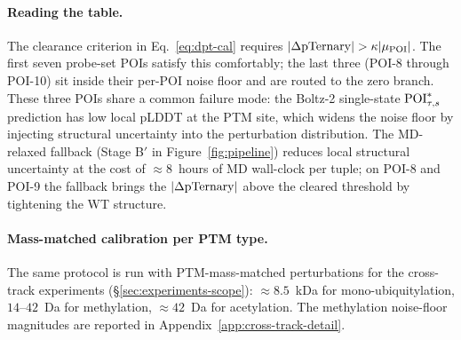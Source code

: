\paragraph{Reading the table.} The clearance criterion in Eq.~\ref{eq:dpt-cal} requires $|\Delta\mathrm{pTernary}| > \kappa|\mu_{\mathrm{POI}}|$. The first seven probe-set POIs satisfy this comfortably; the last three (POI-8 through POI-10) sit inside their per-POI noise floor and are routed to the zero branch. These three POIs share a common failure mode: the Boltz-2 single-state $\mathrm{POI}^{*}_{\tau,s}$ prediction has low local pLDDT at the PTM site, which widens the noise floor by injecting structural uncertainty into the perturbation distribution. The MD-relaxed fallback (Stage B$'$ in Figure~\ref{fig:pipeline}) reduces local structural uncertainty at the cost of $\approx 8$~hours of MD wall-clock per tuple; on POI-8 and POI-9 the fallback brings the $|\Delta\mathrm{pTernary}|$ above the cleared threshold by tightening the WT structure.

\paragraph{Mass-matched calibration per PTM type.} The same protocol is run with PTM-mass-matched perturbations for the cross-track experiments (\S\ref{sec:experiments-scope}): $\approx 8.5$~kDa for mono-ubiquitylation, $14$--$42$~Da for methylation, $\approx 42$~Da for acetylation. The methylation noise-floor magnitudes are reported in Appendix~\ref{app:cross-track-detail}.
